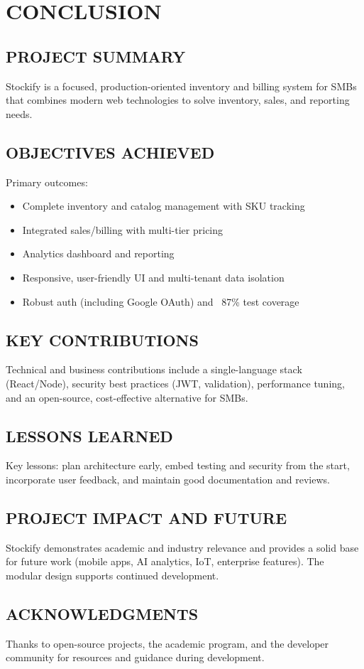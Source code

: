
\chapter{CONCLUSION}

\section{PROJECT SUMMARY}

Stockify is a focused, production-oriented inventory and billing system for SMBs that combines modern web technologies to solve inventory, sales, and reporting needs.

\section{OBJECTIVES ACHIEVED}

Primary outcomes:
\begin{itemize}
	\item Complete inventory and catalog management with SKU tracking
	\item Integrated sales/billing with multi-tier pricing
	\item Analytics dashboard and reporting
	\item Responsive, user-friendly UI and multi-tenant data isolation
	\item Robust auth (including Google OAuth) and ~87\% test coverage
\end{itemize}

\section{KEY CONTRIBUTIONS}

Technical and business contributions include a single-language stack (React/Node), security best practices (JWT, validation), performance tuning, and an open-source, cost-effective alternative for SMBs.

\section{LESSONS LEARNED}

Key lessons: plan architecture early, embed testing and security from the start, incorporate user feedback, and maintain good documentation and reviews.

\section{PROJECT IMPACT AND FUTURE}

Stockify demonstrates academic and industry relevance and provides a solid base for future work (mobile apps, AI analytics, IoT, enterprise features). The modular design supports continued development.

\section{ACKNOWLEDGMENTS}

Thanks to open-source projects, the academic program, and the developer community for resources and guidance during development.
